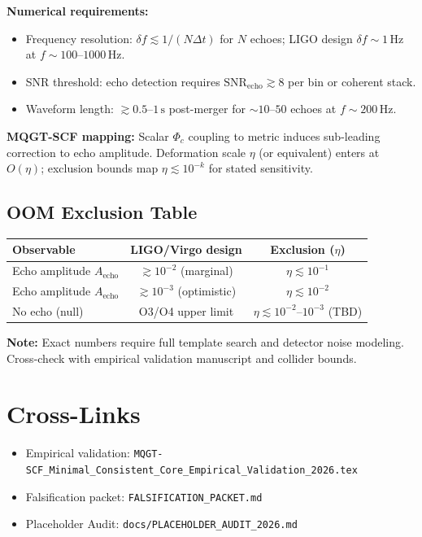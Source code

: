 \documentclass[11pt]{article}
\begin{document}
\textbf{Numerical requirements:}
\begin{itemize}
\item Frequency resolution: $\delta f \lesssim 1/(N \Delta t)$ for $N$ echoes; LIGO design $\delta f \sim 1\,\mathrm{Hz}$ at $f \sim 100$--$1000\,\mathrm{Hz}$.
\item SNR threshold: echo detection requires $\mathrm{SNR}_{\mathrm{echo}} \gtrsim 8$ per bin or coherent stack.
\item Waveform length: $\gtrsim 0.5$--$1\,\mathrm{s}$ post-merger for $\sim 10$--$50$ echoes at $f \sim 200\,\mathrm{Hz}$.
\end{itemize}

\textbf{MQGT-SCF mapping:} Scalar $\Phi_c$ coupling to metric induces sub-leading correction to echo amplitude. Deformation scale $\eta$ (or equivalent) enters at $O(\eta)$; exclusion bounds map $\eta \lesssim 10^{-k}$ for stated sensitivity.

\subsection{OOM Exclusion Table}

\begin{center}
\begin{tabular}{lcc}
\hline
Observable & LIGO/Virgo design & Exclusion ($\eta$) \\
\hline
Echo amplitude $A_{\mathrm{echo}}$ & $\gtrsim 10^{-2}$ (marginal) & $\eta \lesssim 10^{-1}$ \\
Echo amplitude $A_{\mathrm{echo}}$ & $\gtrsim 10^{-3}$ (optimistic) & $\eta \lesssim 10^{-2}$ \\
No echo (null) & O3/O4 upper limit & $\eta \lesssim 10^{-2}$--$10^{-3}$ (TBD) \\
\hline
\end{tabular}
\end{center}

\textbf{Note:} Exact numbers require full template search and detector noise modeling. Cross-check with empirical validation manuscript and collider bounds.

\section{Cross-Links}
\begin{itemize}
\item Empirical validation: \texttt{MQGT-SCF\_Minimal\_Consistent\_Core\_Empirical\_Validation\_2026.tex}
\item Falsification packet: \texttt{FALSIFICATION\_PACKET.md}
\item Placeholder Audit: \texttt{docs/PLACEHOLDER\_AUDIT\_2026.md}
\end{itemize}
\end{document}
